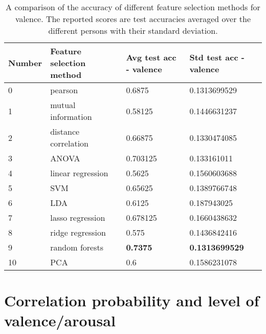 \begin{table}[H]
\centering
\caption{A comparison of the accuracy of different feature selection methods for valence. The reported scores are test accuracies averaged over the different persons with their standard deviation.\label{accCompLblvalence}}
\begin{tabular}{llll}
\textbf{Number} & \textbf{Feature selection method} & \textbf{Avg test acc - valence} & \textbf{Std test acc - valence} \\ \hline
0               & pearson                           & 0.6875                              & 0.1313699529                    \\
1               & mutual information                & 0.58125                             & 0.1446631237                    \\
2               & distance correlation              & 0.66875                             & 0.1330474085                    \\
3               & ANOVA                             & 0.703125                            & 0.133161011                     \\
4               & linear regression                 & 0.5625                              & 0.1560603688                    \\
5               & SVM                               & 0.65625                             & 0.1389766748                    \\
6               & LDA                               & 0.6125                              & 0.187943025                     \\
7               & lasso regression                  & 0.678125                            & 0.1660438632                    \\
8               & ridge regression                  & 0.575                               & 0.1436842416                    \\
9               & random forests                    & \textbf{0.7375}                     & \textbf{0.1313699529}           \\
10              & PCA                               & 0.6                                 & 0.1586231078                   
\end{tabular}
\end{table}

\section{Correlation probability and level of valence/arousal}\label{corrs}

